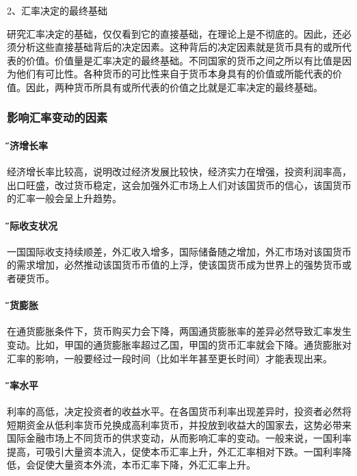 \documentclass[12pt]{article}
\begin{document}
2、汇率决定的最终基础

研究汇率决定的基础，仅仅看到它的直接基础，在理论上是不彻底的。因此，还必须分析这些直接基础背后的决定因素。这种背后的决定因素就是货币具有的或所代表的价值。价值量是汇率决定的最终基础。不同国家的货币之间之所以有比值是因为他们有可比性。各种货币的可比性来自于货币本身具有的价值或所能代表的价值。因此，两种货币所具有或所代表的价值之比就是汇率决定的最终基础。

\subsubsection{影响汇率变动的因素}
\paragraph{\H 经济增长率}
经济增长率比较高，说明改过经济发展比较快，经济实力在增强，投资利润率高，出口旺盛，改过货币稳定，这会加强外汇市场上人们对该国货币的信心，该国货币的汇率一般会呈上升趋势。
\paragraph{\H 国际收支状况}
一国国际收支持续顺差，外汇收入增多，国际储备随之增加，外汇市场对该国货币的需求增加，必然推动该国货币币值的上浮，使该国货币成为世界上的强势货币或者硬货币。
\paragraph{\H 通货膨胀}
在通货膨胀条件下，货币购买力会下降，两国通货膨胀率的差异必然导致汇率发生变动。比如，甲国的通货膨胀率超过乙国，甲国的货币汇率就会下降。通货膨胀对汇率的影响，一般要经过一段时间（比如半年甚至更长时间）才能表现出来。
\paragraph{\H 利率水平}
利率的高低，决定投资者的收益水平。在各国货币利率出现差异时，投资者必然将短期资金从低利率货币兑换成高利率货币，并投放到收益大的国家去，这势必带来国际金融市场上不同货币的供求变动，从而影响汇率的变动。一般来说，一国利率提高，可吸引大量资本流入，促使本币汇率上升，外汇汇率相对下跌。一国利率降低，会促使大量资本外流，本币汇率下降，外汇汇率上升。





\end{document}
